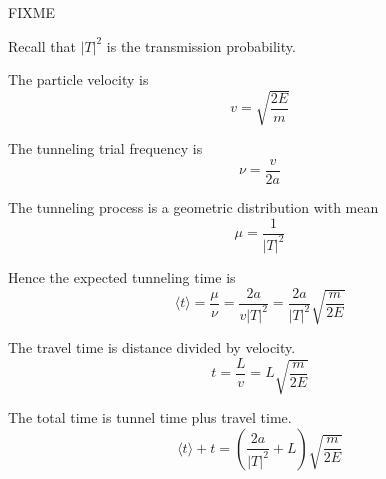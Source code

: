 


FIXME

\bigskip
Recall that $|T|^2$ is the transmission probability.

\bigskip
The particle velocity is
\begin{equation*}
v=\sqrt{\frac{2E}{m}}
\end{equation*}

The tunneling trial frequency is
\begin{equation*}
\nu=\frac{v}{2a}
\end{equation*}

The tunneling process is a geometric distribution with mean
\begin{equation*}
\mu=\frac{1}{|T|^2}
\end{equation*}

Hence the expected tunneling time is
\begin{equation*}
\langle t\rangle=\frac{\mu}{\nu}
=\frac{2a}{v|T|^2}
=\frac{2a}{|T|^2}\sqrt{\frac{m}{2E}}
\end{equation*}

The travel time is distance divided by velocity.
\begin{equation*}
t=\frac{L}{v}=L\sqrt{\frac{m}{2E}}
\end{equation*}

The total time is tunnel time plus travel time.
\begin{equation*}
\langle t\rangle+t
=\left(\frac{2a}{|T|^2}+L\right)\sqrt{\frac{m}{2E}}
\end{equation*}


